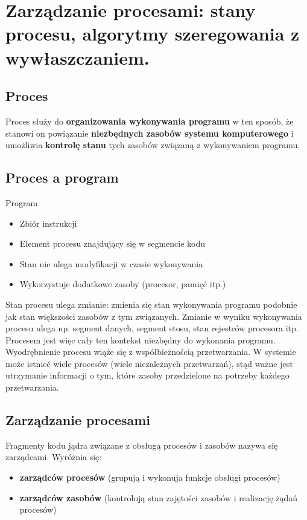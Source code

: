 \documentclass[main.tex]{subfiles}
\begin{document}
    \newpage

    \section{Zarządzanie procesami: stany procesu, algorytmy szeregowania z wywłaszczaniem.}
    \subsection{Proces}
    Proces służy do \textbf{organizowania wykonywania programu} w ten sposób, że stanowi on powiązanie \textbf{niezbędnych zasobów systemu komputerowego} i umożliwia \textbf{kontrolę stanu} tych zasobów związaną z wykonywaniem programu.


    \subsection{Proces a program}
    Program
    \begin{itemize}
        \item Zbiór instrukcji
        \item Element procesu znajdujący się w segmencie kodu
        \item Stan nie ulega modyfikacji w czasie wykonywania
        \item Wykorzystuje dodatkowe zasoby (procesor, pamięć itp.)
    \end{itemize}

    Stan procesu ulega zmianie: zmienia się stan wykonywania programu podobnie jak stan większości zasobów z tym związanych. Zmianie w wyniku wykonywania procesu ulega np. segment danych, segment stosu, stan rejestrów procesora itp. Procesem jest więc cały ten kontekst niezbędny do wykonania programu. Wyodrębnienie procesu wiąże się z współbieżnością przetwarzania. W systemie może istnieć wiele procesów (wiele niezależnych przetwarzań), stąd ważne jest utrzymanie informacji o tym, które zasoby przedzielone na potrzeby każdego przetwarzania.

    \subsection{Zarządzanie procesami}

    Fragmenty kodu jądra związane z obsługą procesów i zasobów nazywa się zarządcami.
    Wyróżnia się:
    \begin{itemize}
        \item \textbf{zarządców procesów} (grupują i wykonuja funkcje obsługi procesów)
        \item \textbf{zarządców zasobów} (kontrolują stan zajętości zasobów i realizację żądań procesów)
    \end{itemize}
\end{document}

